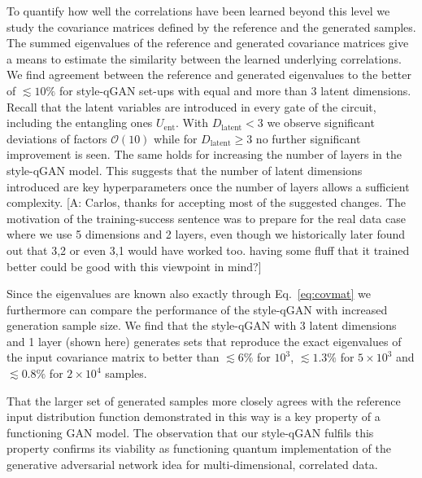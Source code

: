\documentclass[twocolumn,preprintnumbers,superscriptaddress]{revtex4-2}
\newcommand{\commentAF}[1]{{\color{cyan} {[A: #1]}}}
\begin{document}
To quantify how well the correlations have been learned beyond 
this level we study the covariance matrices defined by the reference and the generated samples. The summed eigenvalues of the reference and generated covariance matrices give a means to estimate the similarity between the learned underlying correlations. We find agreement between the reference and generated eigenvalues to the better of $\lesssim 10\%$ for style-qGAN set-ups with equal and more than 3 latent dimensions. Recall that the latent variables are introduced in every gate of the circuit, including the entangling ones $U_{\mathrm{ent}}$.  With $D_{\mathrm{latent}}< 3$ we observe significant deviations of factors $\mathcal{O}(10)$ while for $D_{\mathrm{latent}}\geq 3$ no further significant improvement is seen. The same holds for increasing the number of layers in the style-qGAN model. This suggests that the number of latent dimensions introduced are key hyperparameters once the number of layers allows a sufficient complexity.
\commentAF{Carlos, thanks for accepting most of the suggested changes. The motivation of the training-success sentence was to prepare for the real data case where we use 5 dimensions and 2 layers, even though we historically later found out that 3,2 or even 3,1 would have worked too. having some fluff that it trained better could be good with this viewpoint in mind?}

Since the eigenvalues are known also exactly through Eq.~\ref{eq:covmat} we furthermore can compare the performance of the style-qGAN with increased generation sample size. We find that the style-qGAN with 3 latent dimensions and 1 layer (shown here)
generates sets that reproduce the exact eigenvalues of the input covariance matrix to better than $\lesssim 6\%$ for $10^3$, $\lesssim 1.3\%$ for $5\times10^3$ and $\lesssim 0.8\%$ for $2\times10^4$ samples.

That the larger set of generated samples more closely agrees with the reference input distribution function demonstrated in this way is a key property of a functioning GAN model. The observation that our style-qGAN fulfils this property confirms its viability as functioning quantum implementation of the generative adversarial network idea for multi-dimensional, correlated data.

\end{document}
